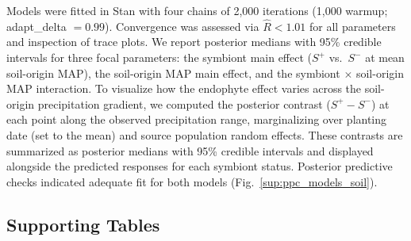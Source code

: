 \documentclass[12pt]{article}\usepackage[]{graphicx}\usepackage[dvipsnames]{xcolor}
\begin{document}
Models were fitted in Stan \citep{Rstan} with four chains of 2,000 iterations (1,000 warmup; adapt\_delta $= 0.99$). Convergence was assessed via $\hat{R} < 1.01$ for all parameters and inspection of trace plots.
We report posterior medians with 95\% credible intervals for three focal parameters: the symbiont main effect ($S^+$ vs.\ $S^-$ at mean soil-origin MAP), the soil-origin MAP main effect, and the symbiont $\times$ soil-origin MAP interaction. 
To visualize how the endophyte effect varies across the soil-origin precipitation gradient, we computed the posterior contrast ($S^+ - S^-$) 
at each point along the observed precipitation range, marginalizing over planting date (set to the mean) and source population random effects. 
These contrasts are summarized as posterior medians with 95\% credible intervals and displayed alongside the predicted responses for each symbiont status. 
Posterior predictive checks indicated adequate fit for both models (Fig.~\ref{sup:ppc_models_soil}).
\clearpage



\begin{landscape}
\subsection*{Supporting Tables}
\begin{table}[htbp]
    \centering
     \caption{Geographic coordinates and descriptions of source populations for study species. For each source population, the table shows the total number of plants included in the experiment, the number of unique genotypes, and the average clonal replication per genotype.}
    \small
    
       \label{tab:source_pop}
\end{table}
\end{landscape}
\clearpage


\begin{table}[ht]
    \centering
    \caption{Summary of symbiont removal treatments by species and population.
    N indicates the number of plants tested for symbiont status and
    \%$S^+$ indicates the proportion that tested positive.
    Treatment refers to the symbiont removal treatment applied to the seed lineage: Control (no treatment) or Heat (5 days in a drying oven at 60\degree C for \emph{E. virginicus} and \emph{P. autumnalis}; 12 min in a 60\degree C water bath for \emph{A. hyemalis}).
    For all populations except SFAEF and PALM, heat-treated seed lineages were one or more generations removed from the treatment; for those two populations, plants from heat-treated seeds were used directly in the experiment.}
    \label{tab:heat_treatment}
    
\end{table}
\clearpage
\end{document}
